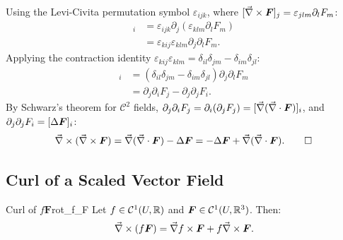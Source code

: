 \begin{demonstration}
Using the Levi-Civita permutation symbol $\varepsilon_{ijk}$, where $[\vec{\nabla}\times \bm{F}]_j = \varepsilon_{jlm} \partial_l F_m$:
\begin{align*}
    [\rot(\rot \bm{F})]_i &= \varepsilon_{ijk} \partial_j (\varepsilon_{klm} \partial_l F_m) \\
    &= \varepsilon_{kij} \varepsilon_{klm} \partial_j \partial_l F_m.
\end{align*}
Applying the contraction identity $\varepsilon_{kij} \varepsilon_{klm} = \delta_{il}\delta_{jm} - \delta_{im}\delta_{jl}$:
\begin{align*}
    [\rot(\rot \bm{F})]_i &= (\delta_{il}\delta_{jm} - \delta_{im}\delta_{jl}) \partial_j \partial_l F_m \\
    &= \partial_j \partial_i F_j - \partial_j \partial_j F_i.
\end{align*}
By Schwarz's theorem for $\mathcal{C}^2$ fields, $\partial_j \partial_i F_j = \partial_i (\partial_j F_j) = [\vec{\nabla}(\vec{\nabla}\cdot \bm{F})]_i$, and $\partial_j \partial_j F_i = [\Delta \bm{F}]_i$:
\begin{equation*}
    \vec{\nabla}\times(\vec{\nabla}\times \bm{F}) = \vec{\nabla}(\vec{\nabla}\cdot \bm{F}) - \Delta \bm{F} = -\Delta \bm{F} + \vec{\nabla}(\vec{\nabla}\cdot \bm{F}). \qedhere
\end{equation*}
\end{demonstration}

\subsection{Curl of a Scaled Vector Field}
\begin{proposition}{Curl of $f \bm{F}$}{rot_f_F}
Let $f \in \mathcal{C}^1(U, \mathbb{R})$ and $\bm{F} \in \mathcal{C}^1(U, \mathbb{R}^3)$. Then:
\begin{equation}
    \vec{\nabla}\times (f \bm{F}) = \vec{\nabla} f \times \bm{F} + f \vec{\nabla}\times \bm{F}.
\end{equation}
\end{proposition}

